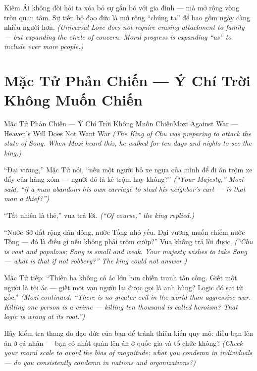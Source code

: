 \begin{baihoc}
Kiêm Ái không đòi hỏi ta xóa bỏ sự gắn bó với gia đình — mà mở rộng vòng tròn quan tâm. Sự tiến bộ đạo đức là mở rộng ``chúng ta'' để bao gồm ngày càng nhiều người hơn.
\textit{(Universal Love does not require erasing attachment to family — but expanding the circle of concern. Moral progress is expanding ``us'' to include ever more people.)}
\end{baihoc}
\ngancach

\section{Mặc Tử Phản Chiến — Ý Chí Trời Không Muốn Chiến}
\begin{truyen}{Mặc Tử Phản Chiến — Ý Chí Trời Không Muốn Chiến}{Mozi Against War — Heaven's Will Does Not Want War}
\textit{(The King of Chu was preparing to attack the state of Song. When Mozi heard this, he walked for ten days and nights to see the king.)}

``Đại vương,'' Mặc Tử nói, ``nếu một người bỏ xe ngựa của mình để đi ăn trộm xe đẩy của hàng xóm — người đó là kẻ trộm hay không?''
\textit{(``Your Majesty,'' Mozi said, ``if a man abandons his own carriage to steal his neighbor's cart — is that man a thief?'')}

``Tất nhiên là thẻ,'' vua trả lời.
\textit{(``Of course,'' the king replied.)}

``Nước Sở đất rộng dân đông, nước Tống nhỏ yếu. Đại vương muốn chiếm nước Tống — đó là điều gì nếu không phải trộm cướp?'' Vua không trả lời được.
\textit{(``Chu is vast and populous; Song is small and weak. Your majesty wishes to take Song — what is that if not robbery?'' The king could not answer.)}

Mặc Tử tiếp: ``Thiên hạ không có ác lớn hơn chiến tranh tấn công. Giết một người là tội ác — giết một vạn người lại được gọi là anh hùng? Logic đó sai từ gốc.''
\textit{(Mozi continued: ``There is no greater evil in the world than aggressive war. Killing one person is a crime — killing ten thousand is called heroism? That logic is wrong at its root.'')}

\end{truyen}

\begin{baihoc}
Hãy kiểm tra thang đo đạo đức của bạn để tránh thiên kiến quy mô: điều bạn lên án ở cá nhân — bạn có nhất quán lên án ở quốc gia và tổ chức không?
\textit{(Check your moral scale to avoid the bias of magnitude: what you condemn in individuals — do you consistently condemn in nations and organizations?)}
\end{baihoc}
\ngancach


